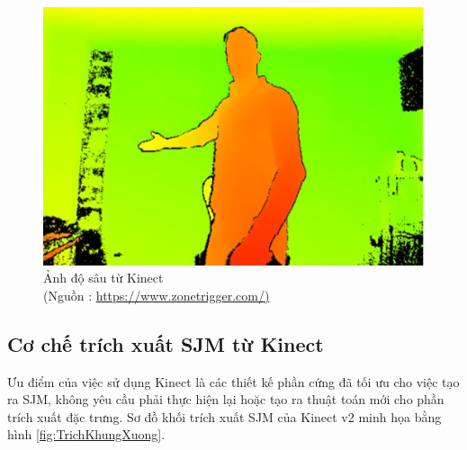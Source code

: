 \FloatBarrier
\begin{figure}[htp]
\begin{center}
\includegraphics[scale=0.8]{chap3/c3_figs/depth.jpg}
\end{center}
\caption{Ảnh độ sâu từ Kinect \\(Nguồn : \url{https://www.zonetrigger.com/)}}
\label{fig:kinect}
\end{figure}
\FloatBarrier

\subsection{Cơ chế trích xuất SJM từ Kinect}
Ưu điểm của việc sử dụng Kinect là các thiết kế phần cứng đã tối ưu cho việc tạo ra SJM, không yêu cầu phải thực hiện lại hoặc tạo ra thuật toán mới cho phần trích xuất đặc trưng. Sơ đồ khối trích xuất SJM của Kinect v2 minh họa bằng hình \ref{fig:TrichKhungXuong}.

